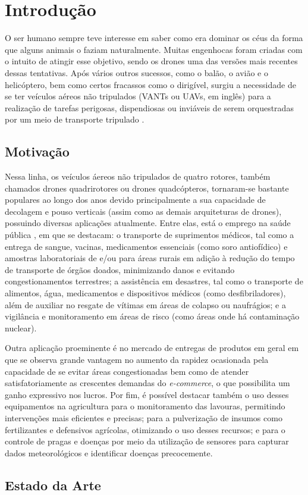 \section{Introdução}
O ser humano sempre teve interesse em saber como era dominar os céus da forma que alguns animais o faziam 
naturalmente. Muitas engenhocas foram criadas com o intuito de atingir esse objetivo, sendo os drones uma das 
versões mais recentes dessas tentativas. Após vários outros sucessos, como o balão, o avião e o helicóptero, bem 
como certos fracassos como o dirigível, surgiu a necessidade de se ter veículos aéreos não tripulados (VANTs ou 
UAVs, em inglês) para a realização de tarefas perigosas, dispendiosas ou inviáveis de serem orquestradas por um 
meio de transporte tripulado \cite{ita}.

\subsection{Motivação}
Nessa linha, os veículos áereos não tripulados de quatro rotores, também chamados drones quadrirotores ou drones 
quadcópteros, tornaram-se bastante populares ao longo dos anos devido principalmente a sua capacidade de decolagem 
e pouso verticais (assim como as demais arquiteturas de drones), possuindo diversas aplicações atualmente. Entre 
elas, está o emprego na saúde pública \cite{drone_medico}, em que se destacam: o transporte de suprimentos médicos, 
tal como a entrega de sangue, vacinas, medicamentos essenciais (como soro antiofídico) e amostras laboratoriais de 
e/ou para áreas rurais em adição à redução do tempo de transporte de órgãos doados, minimizando danos e evitando 
congestionamentos terrestres; a assistência em desastres, tal como o transporte de alimentos, água, medicamentos e 
dispositivos médicos (como desfibriladores), além de auxiliar no resgate de vítimas em áreas de colapso ou 
naufrágios; e a vigilância e monitoramento em áreas de risco (como áreas onde há contaminação nuclear).

Outra aplicação proeminente é no mercado de entregas de produtos em geral \cite{drone_entrega} em que se observa 
grande vantagem no aumento da rapidez ocasionada pela capacidade de se evitar áreas congestionadas bem como de 
atender satisfatoriamente as crescentes demandas do \textit{e-commerce}, o que possibilita um ganho expressivo nos 
lucros. Por fim, é possível destacar também o uso desses equipamentos na agricultura \cite{drone_agricultura} para o 
monitoramento das lavouras, permitindo intervenções mais eficientes e precisas; para a pulverização de insumos como 
fertilizantes e defensivos agrícolas, otimizando o uso desses recursos; e para o controle de pragas e doenças por meio 
da utilização de sensores para capturar dados meteorológicos e identificar doenças precocemente.

\subsection{Estado da Arte}